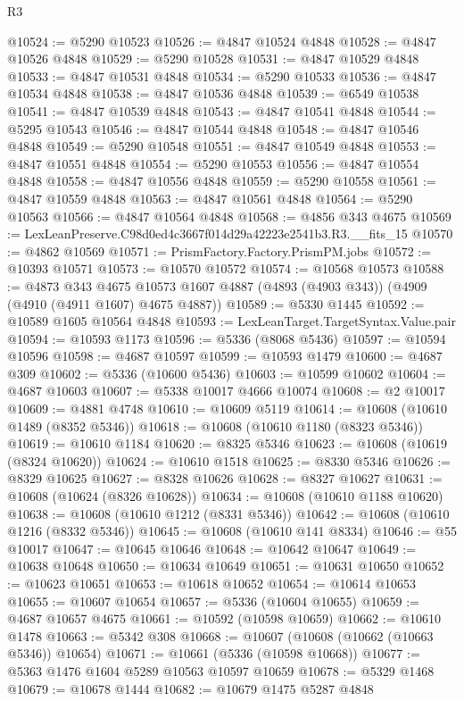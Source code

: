 \begin{lexlean}{R3}
\begin{coremodule}
@10524 := @5290 @10523
@10526 := @4847 @10524 @4848
@10528 := @4847 @10526 @4848
@10529 := @5290 @10528
@10531 := @4847 @10529 @4848
@10533 := @4847 @10531 @4848
@10534 := @5290 @10533
@10536 := @4847 @10534 @4848
@10538 := @4847 @10536 @4848
@10539 := @6549 @10538
@10541 := @4847 @10539 @4848
@10543 := @4847 @10541 @4848
@10544 := @5295 @10543
@10546 := @4847 @10544 @4848
@10548 := @4847 @10546 @4848
@10549 := @5290 @10548
@10551 := @4847 @10549 @4848
@10553 := @4847 @10551 @4848
@10554 := @5290 @10553
@10556 := @4847 @10554 @4848
@10558 := @4847 @10556 @4848
@10559 := @5290 @10558
@10561 := @4847 @10559 @4848
@10563 := @4847 @10561 @4848
@10564 := @5290 @10563
@10566 := @4847 @10564 @4848
@10568 := @4856 @343 @4675
@10569 := LexLeanPreserve.C98d0ed4c3667f014d29a42223e2541b3.R3.__fits_15
@10570 := @4862 @10569
@10571 := PrismFactory.Factory.PrismPM.jobs
@10572 := @10393 @10571
@10573 := @10570 @10572
@10574 := @10568 @10573
@10588 := @4873
    @343
    @4675
    @10573
    @1607
    @4887
    (@4893 (@4903 @343))
    (@4909 (@4910 (@4911 @1607) @4675 @4887))
@10589 := @5330 @1445
@10592 := @10589 @1605 @10564 @4848
@10593 := LexLeanTarget.TargetSyntax.Value.pair
@10594 := @10593 @1173
@10596 := @5336 (@8068 @5436)
@10597 := @10594 @10596
@10598 := @4687 @10597
@10599 := @10593 @1479
@10600 := @4687 @309
@10602 := @5336 (@10600 @5436)
@10603 := @10599 @10602
@10604 := @4687 @10603
@10607 := @5338 @10017 @4666 @10074
@10608 := @2 @10017
@10609 := @4881 @4748
@10610 := @10609 @5119
@10614 := @10608 (@10610 @1489 (@8352 @5346))
@10618 := @10608 (@10610 @1180 (@8323 @5346))
@10619 := @10610 @1184
@10620 := @8325 @5346
@10623 := @10608 (@10619 (@8324 @10620))
@10624 := @10610 @1518
@10625 := @8330 @5346
@10626 := @8329 @10625
@10627 := @8328 @10626
@10628 := @8327 @10627
@10631 := @10608 (@10624 (@8326 @10628))
@10634 := @10608 (@10610 @1188 @10620)
@10638 := @10608 (@10610 @1212 (@8331 @5346))
@10642 := @10608 (@10610 @1216 (@8332 @5346))
@10645 := @10608 (@10610 @141 @8334)
@10646 := @55 @10017
@10647 := @10645 @10646
@10648 := @10642 @10647
@10649 := @10638 @10648
@10650 := @10634 @10649
@10651 := @10631 @10650
@10652 := @10623 @10651
@10653 := @10618 @10652
@10654 := @10614 @10653
@10655 := @10607 @10654
@10657 := @5336 (@10604 @10655)
@10659 := @4687 @10657 @4675
@10661 := @10592 (@10598 @10659)
@10662 := @10610 @1478
@10663 := @5342 @308
@10668 := @10607 (@10608 (@10662 (@10663 @5346)) @10654)
@10671 := @10661 (@5336 (@10598 @10668))
@10677 := @5363 @1476 @1604 @5289 @10563 @10597 @10659
@10678 := @5329 @1468
@10679 := @10678 @1444
@10682 := @10679 @1475 @5287 @4848

\end{coremodule}
\end{lexlean}

